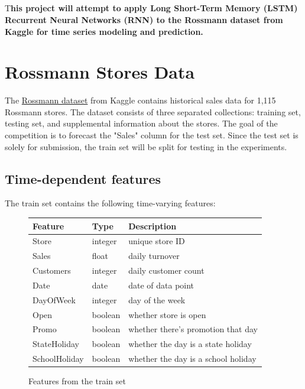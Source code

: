 \documentclass[DIV=calc, paper=a4, fontsize=11pt, twocolumn]{scrartcl}
\title{\hmwkClass \\
       \hmwkTitle}
\author{\hmwkAuthorFullName}
\date{\hmwkDueDate}
\newcommand{\initial}[1]{%
    \lettrine[lines=3,lhang=0.3,nindent=0em]{
        \color{brsublue}
        {\textsf{#1}}}{}}
\begin{document}
\maketitle
\thispagestyle{fancy}

\initial{T}\textbf{his project will attempt to apply Long Short-Term Memory (LSTM) Recurrent Neural Networks (RNN) to the Rossmann dataset from Kaggle for time series modeling and prediction.}

\section{Rossmann Stores Data}
	The \href{https://www.kaggle.com/c/rossmann-store-sales/data}{Rossmann dataset} from Kaggle contains historical sales data for 1,115 Rossmann stores. The dataset consists of three separated collections: training set, testing set, and supplemental information about the stores. The goal of the competition is to forecast the "Sales" column for the test set. Since the test set is solely for submission, the train set will be split for testing in the experiments.
	\subsection{Time-dependent features}
    The train set contains the following time-varying features:

    \begin{figure}[H]
        \centering
	    \begin{tabular}{llp{3cm}}
	    \toprule
	    Feature & Type & Description\\
	    \toprule
	    Store 			& integer 	& unique store ID \\
	    Sales 			& float 	& daily turnover \\
	    Customers 		& integer 	& daily customer count \\
	    Date			& date		& date of data point \\
	    DayOfWeek		& integer	& day of the week \\
	    Open 			& boolean 	& whether store is open \\
	    Promo			& boolean 	& whether there's promotion that day \\
	    StateHoliday	& boolean	& whether the day is a state holiday \\
	    SchoolHoliday 	& boolean 	& whether the day is a school holiday \\
	    \bottomrule
	    \end{tabular}
        \caption{Features from the train set}
	    \end{figure}
\end{document}
